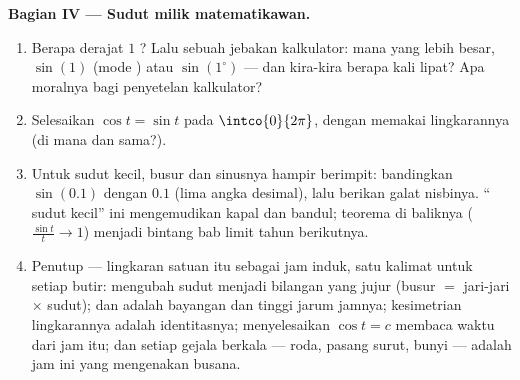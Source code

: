 \begin{problem}
\medskip
\noindent\textbf{Bagian IV --- Sudut milik matematikawan.}
\begin{enumerate}[resume]
  \item Berapa derajat $1$ ? Lalu sebuah jebakan kalkulator:
        mana yang lebih besar, $\sin(1)$ (mode ) atau
        $\sin(1^\circ)$ --- dan kira-kira berapa kali lipat? Apa moralnya
        bagi penyetelan kalkulator?
  \item Selesaikan $\cos t = \sin t$ pada $\intco{0}{2\pi}$, dengan
        memakai lingkarannya (di mana  dan  sama?).
  \item Untuk sudut kecil, busur dan sinusnya hampir berimpit:
        bandingkan $\sin(0.1)$ dengan $0.1$ (lima angka desimal), lalu
        berikan galat nisbinya. `` sudut kecil'' ini
        mengemudikan kapal dan bandul; teorema
        di baliknya ($\frac{\sin t}{t} \to 1$) menjadi bintang bab
        limit tahun berikutnya.
  \item Penutup --- lingkaran satuan itu sebagai jam induk, satu
        kalimat untuk setiap butir:  mengubah sudut menjadi bilangan yang jujur
        (busur $=$ jari-jari $\times$ sudut);  dan  adalah
        bayangan dan tinggi jarum jamnya; kesimetrian lingkarannya
        adalah identitasnya; menyelesaikan $\cos t = c$ membaca waktu
        dari jam itu; dan setiap gejala berkala --- roda,
        pasang surut, bunyi --- adalah jam ini yang mengenakan busana.

\end{enumerate}
\end{problem}
